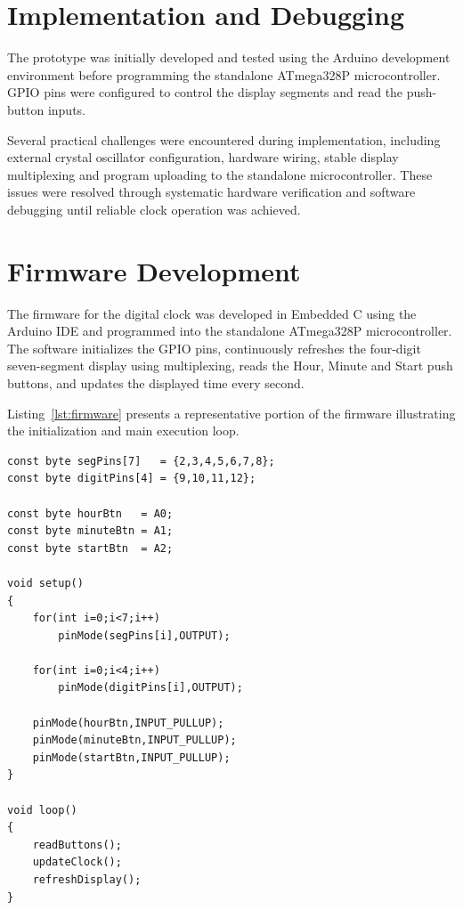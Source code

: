 \documentclass[11pt,a4paper]{report}
\begin{document}

\section{Implementation and Debugging}

The prototype was initially developed and tested using the Arduino development environment before programming the standalone ATmega328P microcontroller. GPIO pins were configured to control the display segments and read the push-button inputs.

Several practical challenges were encountered during implementation, including external crystal oscillator configuration, hardware wiring, stable display multiplexing and program uploading to the standalone microcontroller. These issues were resolved through systematic hardware verification and software debugging until reliable clock operation was achieved.


\section{Firmware Development}

The firmware for the digital clock was developed in Embedded C using the Arduino IDE and programmed into the standalone ATmega328P microcontroller. The software initializes the GPIO pins, continuously refreshes the four-digit seven-segment display using multiplexing, reads the Hour, Minute and Start push buttons, and updates the displayed time every second.

Listing~\ref{lst:firmware} presents a representative portion of the firmware illustrating the initialization and main execution loop.

\begin{lstlisting}[caption={Main Firmware Structure},label={lst:firmware}]
const byte segPins[7]   = {2,3,4,5,6,7,8};
const byte digitPins[4] = {9,10,11,12};

const byte hourBtn   = A0;
const byte minuteBtn = A1;
const byte startBtn  = A2;

void setup()
{
    for(int i=0;i<7;i++)
        pinMode(segPins[i],OUTPUT);

    for(int i=0;i<4;i++)
        pinMode(digitPins[i],OUTPUT);

    pinMode(hourBtn,INPUT_PULLUP);
    pinMode(minuteBtn,INPUT_PULLUP);
    pinMode(startBtn,INPUT_PULLUP);
}

void loop()
{
    readButtons();
    updateClock();
    refreshDisplay();
}
\end{lstlisting}
\end{document}
